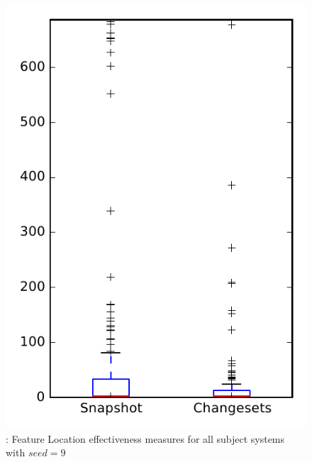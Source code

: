 
\begin{figure}
\centering
\includegraphics[height=0.4\textheight]{figures/flt_seed/rq1_overview_9}
\caption{\rone: Feature Location effectiveness measures for all subject systems with $seed=9$}
\label{fig:flt_seed:rq1:overview}
\end{figure}
